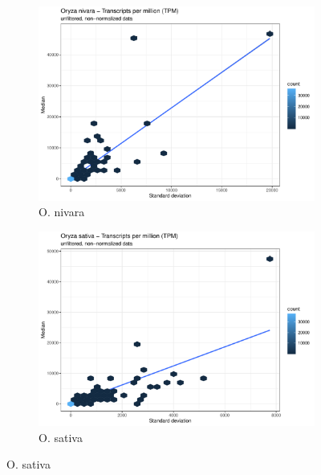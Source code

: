 \begin{figure}[htbp]
    \caption{TPM statistics about the imported kallisto data}
    \label{fig:2.1-TPM-Stats}
    \begin{subfigure}[t]{0.48\linewidth}
        \caption{O. nivara}
        \label{fig:2.1-TPM-Stats-Oryza_nivara}
        \includegraphics[width=\textwidth]{../../results/plots-and-tables/2.1-TPM-Stats-Oryza_nivara}
    \end{subfigure}
    \begin{subfigure}[t]{0.48\linewidth}
        \caption{O. sativa}
        \label{fig:2.1-TPM-Stats-Oryza_sativa}
        \includegraphics[width=\textwidth]{../../results/plots-and-tables/2.1-TPM-Stats-Oryza_sativa}
    \end{subfigure}
\end{figure}

